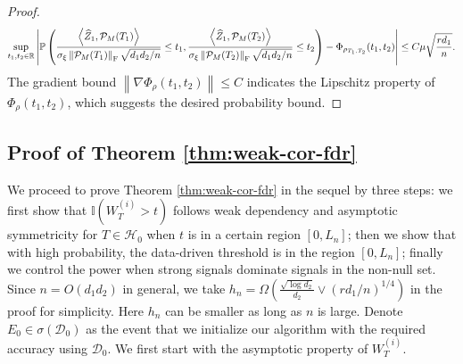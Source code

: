 \documentclass[12pt]{article}
\newcommand{\tF}{{\rm F}}
\newcommand{\abs}[1]{\left\lvert#1\right\rvert}
\newcommand{\norm}[1]{\left\lVert#1\right\rVert}
\newcommand{\PP}{\mathbb{P}}
\newcommand{\R}{\mathbb{R}}
\newcommand{\cH}{\mathcal{H}}
\newcommand{\cP}{\mathcal{P}}
\newcommand{\cD}{\mathcal{D}}
\newcommand{\bbI}{\mathbb{I}}
\def\PP{{\mathbb P}}
\theoremstyle{plain}
\begin{document}
\begin{proof}
\begin{equation}
    \begin{aligned}
       \sup_{t_1,t_2\in \R} \abs{ \PP \left( \frac{\left\langle  \widehat{Z}_1 , \cP_M(T_1) \right\rangle }{\sigma_{\xi} \norm{\cP_M(T_1) }_\tF  \sqrt{d_1 d_2/n}}\le t_1, \frac{\left\langle  \widehat{Z}_1 , \cP_M(T_2) \right\rangle }{\sigma_{\xi} \norm{\cP_M(T_2) }_\tF  \sqrt{d_1 d_2/n}}  \le t_2  \right) - \Phi_{\rho_{T_1,T_2}}(t_1,t_2)}\le C \mu \sqrt{\frac{r d_1}{n}}.
    \end{aligned}
\end{equation}
The gradient bound  $\norm{\nabla \Phi_{\rho} (t_1,t_2)}\le C$ indicates the Lipschitz property of $\Phi_{\rho} (t_1,t_2)$, which suggests the desired probability bound. 
\end{proof}


\subsection{Proof of Theorem \ref{thm:weak-cor-fdr}}
We proceed to prove Theorem \ref{thm:weak-cor-fdr} in the sequel by three steps: we first show that $\bbI(W_{T}^{(i)}>t) $ follows weak dependency and asymptotic symmetricity for $T\in\cH_0$ when $t$ is in a certain region $[0,L_n]$; then we show that with high probability, the data-driven threshold is in the region $[0,L_n]$; finally we control the power when strong signals dominate signals in the non-null set. Since $n=O(d_1 d_2)$ in general, we take $h_n=\Omega({\frac{\sqrt{\log d_2} }{d_2 } }\vee (rd_1/n)^{1/4} ) $ in the proof for simplicity. Here $h_n$ can be smaller as long as $n$ is large. Denote $E_0\in \sigma(\cD_0)$ as the event that we initialize our algorithm with the required accuracy using $\cD_0$. We first start with the asymptotic property of ${W}^{(i)}_{T}$.
\end{document}
